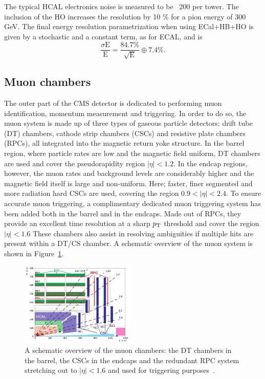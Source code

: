 The typical HCAL electronics noise is measured to be ~200 \MeV per tower.
The inclusion of the HO increases the resolution by 10 \% for a pion energy of 300 GeV.
The final energy resolution parametrization when using ECal+HB+HO is given by a stochastic and a constant term, as for ECAL, and is
\begin{equation*}
  \frac{\sigma \textrm{E}}{\textrm{E}} = \frac{84.7 \%}{\sqrt{\textrm{E}}}\oplus 7.4 \%.
\end{equation*}

\subsection{Muon chambers}
The outer part of the CMS detector is dedicated to performing muon identification, momentum measurement and triggering.
In order to do so, the muon system is made up of three types of gaseous particle detectors: drift tube (DT) chambers, cathode strip chambers (CSCs) and resistive plate chambers (RPCs), all integrated into the magnetic return yoke structure.
In the barrel region, where particle rates are low and the magnetic field uniform, DT chambers are used and cover the pseudorapidity region $|\eta|< 1.2$. In the endcap regions, however, the muon rates and background levels are considerably higher and the magnetic field itself is large and non-uniform. Here; faster, finer segmented and more radiation hard CSCs are used, covering the region $0.9 < |\eta|< 2.4$.
To ensure accurate muon triggering, a complimentary dedicated muon triggering system has been added both in the barrel and in the endcaps. Made out of RPCs, they provide an excellent time resolution at a sharp $p_{\mathrm{T}}$ threshold and cover the region $|\eta|< 1.6$
These chambers also assist in resolving ambiguities if multiple hits are present within a DT/CS chamber.
A schematic overview of the muon system is shown in Figure~\ref{fig:cms:muon-sys}.

\begin{figure}[h] 
    \centering
    \includegraphics[width=0.49\textwidth]{figures/cms/MuonSys.png}
    \caption{A schematic overview of the muon chambers: the DT chambers in the barrel, the CSCs in the endcaps and the redundant RPC system stretching out to $|\eta|< 1.6$ and used for triggering purposes~\cite{Kim:1477844}.}
    \label{fig:cms:muon-sys}
\end{figure}




